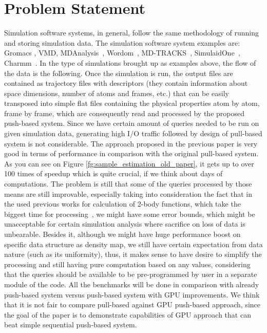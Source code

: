 \documentclass[11pt,a4paper]{report}
\begin{document}
\section{Problem Statement}
Simulation software systems, in general, follow the same methodology of running and storing simulation data. The simulation software system examples are: Gromacs \cite{GROMACS4}, VMD\cite{VMD}, MDAnalysis~\cite{MDAnalysis}, Wordom~\cite{wordom}, MD-TRACKS~\cite{MDtracks}, SimulaidOne~\cite{Simulaid}, Charmm~\cite{CHARMM}. In the type of simulations brought up as examples above, the flow of the data is the following. Once the simulation is run, the output files are contained as trajectory files with descriptors (they contain information about space dimensions, number of atoms and frames, etc.) that can be easily transposed into simple flat files containing the physical properties atom by atom, frame by frame, which are consequently read and processed by the proposed push-based system. Since we have certain amount of queries needed to be run on given simulation data, generating high I/O traffic followed by design of pull-based system is not considerable. The approach proposed in the previous paper is very good in terms of performance in comparison with the original pull-based system\cite{mainPaper}. As you can see on Figure \ref{fg:sample_estimation_old_paper}, it gets up to over 100 times of speedup which is quite crucial, if we think about days of computations. The problem is still that some of the queries processed by those means are still improvable, especially taking into consideration the fact that in the used previous works for calculation of 2-body functions, which take the biggest time for processing~\cite{ytu:icde09, EDBT12}, we might have some error bounds, which might be unacceptable for certain simulation analysis where sacrifice on loss of data is unbearable. Besides it, although we might have huge performance boost on specific data structure as density map, we still have certain expectation from data nature (such as its uniformity), thus, it makes sense to have desire to simplify the processing and still having pure computation based on any values, considering that the queries should be available to be pre-programmed by user in a separate module of the code. All the benchmarks will be done in comparison with already push-based system versus push-based system with GPU improvements. We think that it is  not fair to compare pull-based against GPU push-based approach, since the goal of the paper is to demonstrate capabilities of GPU approach that can beat simple sequential push-based system.
\end{document}

